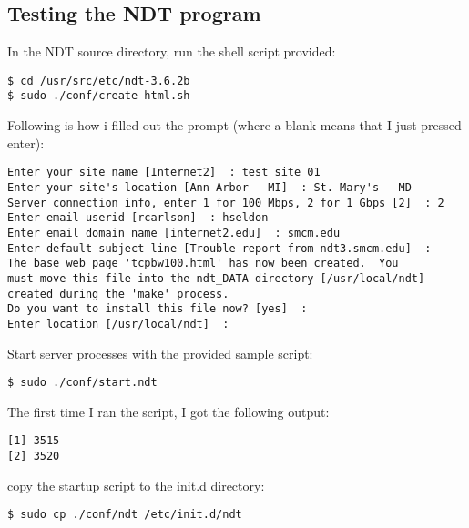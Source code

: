 \subsection{Testing the NDT program}
In the NDT source directory, run the shell script provided:
\begin{snugshade}\begin{lstlisting}
$ cd /usr/src/etc/ndt-3.6.2b 
$ sudo ./conf/create-html.sh
\end{lstlisting}\end{snugshade}\noindent
Following is how i filled out the prompt (where a blank means that I just pressed enter):
\begin{snugshade}\begin{lstlisting}
Enter your site name [Internet2]  : test_site_01
Enter your site's location [Ann Arbor - MI]  : St. Mary's - MD
Server connection info, enter 1 for 100 Mbps, 2 for 1 Gbps [2]  : 2
Enter email userid [rcarlson]  : hseldon
Enter email domain name [internet2.edu]  : smcm.edu
Enter default subject line [Trouble report from ndt3.smcm.edu]  : 
The base web page 'tcpbw100.html' has now been created.  You 
must move this file into the ndt_DATA directory [/usr/local/ndt]
created during the 'make' process.
Do you want to install this file now? [yes]  : 
Enter location [/usr/local/ndt]  : 
\end{lstlisting}\end{snugshade}\noindent
Start server processes with the provided sample script:
\begin{snugshade}\begin{lstlisting}
$ sudo ./conf/start.ndt
\end{lstlisting}\end{snugshade}\noindent
The first time I ran the script, I got the following output: 
\begin{snugshade}\begin{lstlisting}
[1] 3515
[2] 3520
\end{lstlisting}\end{snugshade}\noindent
copy the startup script to the init.d directory:
\begin{snugshade}\begin{lstlisting}
$ sudo cp ./conf/ndt /etc/init.d/ndt
\end{lstlisting}\end{snugshade}\noindent



